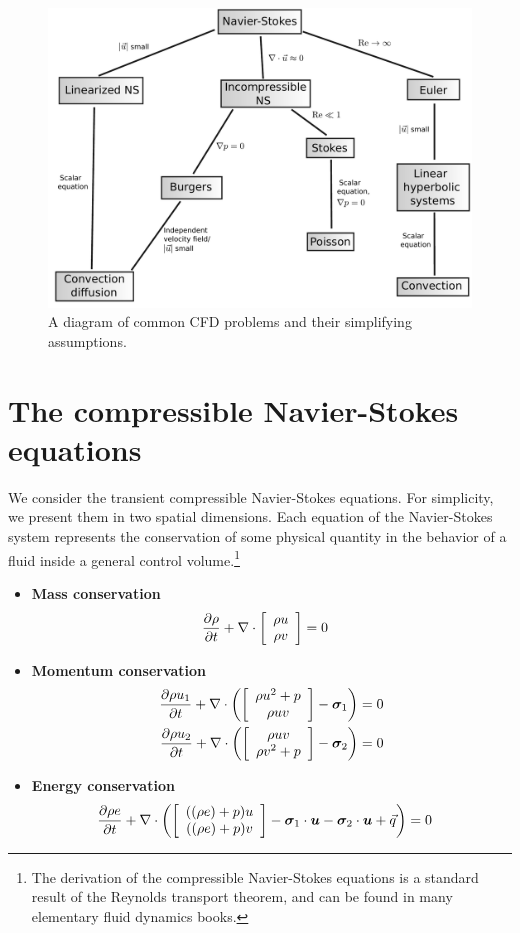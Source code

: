 

\begin{figure}[!h]
\centering
\includegraphics[scale=.45]{figs/CFD_tree.pdf}
\caption{A diagram of common CFD problems and their simplifying assumptions.}
\end{figure}

\section{The compressible Navier-Stokes equations}

We consider the transient compressible Navier-Stokes equations. For simplicity, we present them in two spatial dimensions. Each equation of the Navier-Stokes system represents the conservation of some physical quantity in the behavior of a fluid inside a general control volume.\footnote{The derivation of the compressible Navier-Stokes equations is a standard result of the Reynolds transport theorem, and can be found in many elementary fluid dynamics books.}

\begin{itemize}
\item{\textbf{Mass conservation}}
\begin{align*}
\pd{\rho}{t} + \div \vecttwo{\rho u }{\rho v} &= 0
\end{align*}

\item{\textbf{Momentum conservation}}
\begin{align*}
\pd{\rho u_1}{t} + \div \left(\vecttwo{\rho u^2+p }{\rho u v} - \boldsymbol \sigma_{1}\right) &=0\\
\pd{\rho u_2}{t} + \div \left(\vecttwo{\rho u v}{\rho v^2+p } - \boldsymbol \sigma_{2}\right) &=0
\end{align*}

\item{\textbf{Energy conservation}}
\begin{align*}
\pd{\rho e}{t} + \div \left(\vecttwo{((\rho e)+p)u}{((\rho e)+p)v} - \boldsymbol \sigma_1 \cdot \boldsymbol u- \boldsymbol \sigma_2 \cdot \boldsymbol u + \vec{q}\right) &=0
\end{align*}
\end{itemize}


